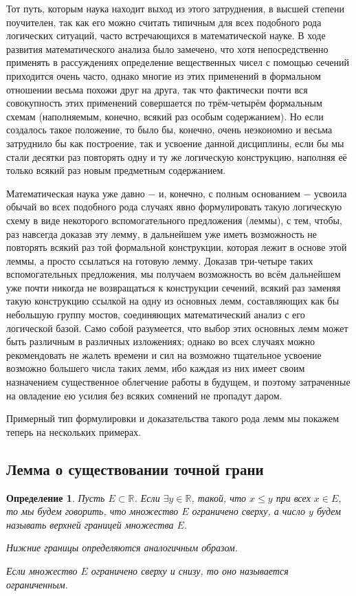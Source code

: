\documentclass{article}
\newtheorem{definition}{Определение}[section]
\begin{document}
Тот путь, которым наука находит выход из этого затруднения, в высшей степени поучителен, так как его можно считать типичным для всех подобного рода логических ситуаций, часто встречающихся в математической науке. В ходе развития математического анализа было замечено, что хотя непосредственно применять в рассуждениях определение вещественных чисел с помощью сечений приходится очень часто, однако многие из этих применений в формальном отношении весьма похожи друг на друга, так что фактически почти вся совокупность этих применений совершается по трём-четырём формальным схемам (наполняемым, конечно, всякий раз особым содержанием). Но если создалось такое положение, то было бы, конечно, очень неэкономно и весьма затруднило бы как построение, так и усвоение данной дисциплины, если бы мы стали десятки раз повторять одну и ту же логическую конструкцию, наполняя её только всякий раз новым предметным содержанием.

Математическая наука уже давно \(-\) и, конечно, с полным основанием \(-\) усвоила обычай во всех подобного рода случаях явно формулировать такую логическую схему в виде некоторого вспомогательного предложения (леммы), с тем, чтобы, раз навсегда доказав эту лемму, в дальнейшем уже иметь возможность не повторять всякий раз той формальной конструкции, которая лежит в основе этой леммы, а просто ссылаться на готовую лемму. Доказав три-четыре таких вспомогательных предложения, мы получаем возможность во всём дальнейшем уже почти никогда не возвращаться к конструкции сечений, всякий раз заменяя такую конструкцию ссылкой на одну из основных лемм, составляющих как бы небольшую группу мостов, соединяющих математический анализ с его логической базой. Само собой разумеется, что выбор этих основных лемм может быть различным в различных изложениях; однако во всех случаях можно рекомендовать не жалеть времени и сил на возможно тщательное усвоение возможно большего числа таких лемм, ибо каждая из них имеет своим назначением существенное облегчение работы в будущем, и поэтому затраченные на овладение ею усилия без всяких сомнений не пропадут даром.

Примерный тип формулировки и доказательства такого рода лемм мы покажем теперь на нескольких примерах.

\subsection{Лемма о существовании точной грани}

\begin{definition}
Пусть \(E \subset \mathbb{R}\). Если \(\exists y \in \mathbb{R}\), такой, что \(x \leq y\) при всех \(x \in E\), то мы будем говорить, что множество \(E\) ограничено сверху, а число \(y\) будем называть верхней границей множества \(E\).

Нижние границы определяются аналогичным образом.

Если множество \(E\) ограничено сверху и снизу, то оно называется ограниченным.

\end{definition}
\end{document}
